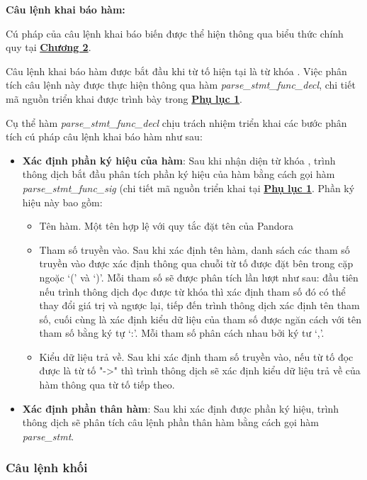 \noindent\textbf{Câu lệnh khai báo hàm:}

Cú pháp của câu lệnh khai báo biến được thể hiện thông qua biểu thức chính quy tại \hyperref[ch2:decl_func_stmt]{\bf Chương 2}.

Câu lệnh khai báo hàm được bắt đầu khi từ tố hiện tại là từ khóa . Việc phân tích câu lệnh này được thực hiện thông qua hàm \textit{parse\_stmt\_func\_decl}, chi tiết mã nguồn triển khai được trình bày trong \hyperref[ap1:stmt_decl_fun]{\bf Phụ lục 1}. %

Cụ thể hàm \textit{parse\_stmt\_func\_decl} chịu trách nhiệm triển khai các bước phân tích cú pháp câu lệnh khai báo hàm như sau:

\begin{itemize}
    \item \textbf{Xác định phần ký hiệu của hàm}: Sau khi nhận diện từ khóa , trình thông dịch bắt đầu phân tích phần ký hiệu của hàm bằng cách gọi hàm \textit{parse\_stmt\_func\_sig} (chi tiết mã nguồn triển khai tại \hyperref[ap1:stmt_decl_fun_sig]{\bf Phụ lục 1}. %
    Phần ký hiệu này bao gồm:
    \begin{itemize}
        \item Tên hàm. Một tên hợp lệ với quy tắc đặt tên của Pandora
        \item Tham số truyền vào. Sau khi xác định tên hàm, danh sách các tham số truyền vào được xác định thông qua chuỗi từ tố được đặt bên trong cặp ngoặc `(' và `)'. Mỗi tham số sẽ được phân tích lần lượt như sau: đầu tiên nếu trình thông dịch đọc được từ khóa  thì xác định tham số đó có thể thay đổi giá trị và ngược lại, tiếp đến trình thông dịch xác định tên tham số, cuối cùng là xác định kiểu dữ liệu của tham số được ngăn cách với tên tham số bằng ký tự `:'. Mỗi tham số phân cách nhau bởi ký tư `,'.
        \item Kiểu dữ liệu trả về. Sau khi xác định tham số truyền vào, nếu từ tố đọc được là từ tố "->" thì trình thông dịch sẽ xác định kiểu dữ liệu trả về của hàm thông qua từ tố tiếp theo.
    \end{itemize}
    \item \textbf{Xác định phần thân hàm}: Sau khi xác định được phần ký hiệu, trình thông dịch sẽ phân tích câu lệnh phần thân hàm bằng cách gọi hàm \textit{parse\_stmt}.
\end{itemize}

\subsubsection{Câu lệnh khối}

